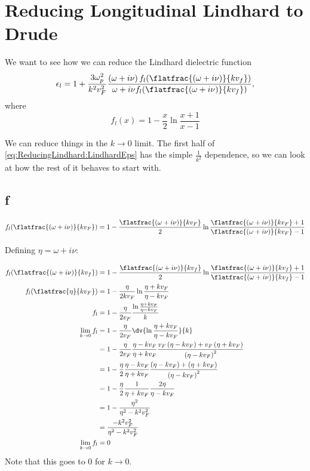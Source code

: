 \documentclass[../../main.tex]{subfiles}
\newcommand{\vf}{v_F}
\begin{document}
\section{Reducing Longitudinal Lindhard to Drude}
We want to see how we can reduce the Lindhard dielectric function
\begin{equation} \label{eq:ReducingLindhard:LindhardEps} 
 \epsilon_l = 1 + \frac{3 \omega_p^2}{k^2 v_F^2} \frac{\left(\omega + i \nu \right) f_l(\flatfrac{(\omega + i \nu)}{k v_f})}{\omega + i \nu f_l(\flatfrac{(\omega + i \nu)}{k v_f})},
\end{equation}
where 
\begin{equation}
	f_l(x) = 1 - \frac{x}{2} \ln\frac{x + 1}{x - 1}
\end{equation}

We can reduce things in the $k \rightarrow 0$ limit. The first half of \eqref{eq:ReducingLindhard:LindhardEps} has the simple $\frac{1}{k^2}$ dependence, so we can look at how the rest of it behaves to start with. 

\subsection{f}

\begin{align}
		f_l(\flatfrac{(\omega + i \nu)}{k v_F}) = 1 - \frac{\flatfrac{(\omega + i \nu)}{k v_F}}{2} \ln\frac{\flatfrac{(\omega + i \nu)}{k v_F} + 1}{\flatfrac{(\omega + i \nu)}{k v_F} - 1}
\end{align}

Defining $\eta = \omega + i \nu$:

\begin{align}
	f_l(\flatfrac{(\omega + i \nu)}{k v_f}) &= 1 - \frac{\flatfrac{(\omega + i \nu)}{k v_f}}{2} \ln\frac{\flatfrac{(\omega + i \nu)}{k v_f} + 1}{\flatfrac{(\omega + i \nu)}{k v_f} - 1} \\
	f_l(\flatfrac{\eta}{k \vf}) &= 1 - \frac{\eta}{2 k \vf} \ln\frac{\eta + k \vf}{\eta - k\vf} \\
	f_l &=  1 - \frac{\eta}{2 \vf} \frac{\ln\frac{\eta + k \vf}{\eta - k\vf}}{k} \\ 
	\lim_{k \to 0} f_l &= 1 - \frac{\eta}{2 \vf} \dv{\ln\frac{\eta + k \vf}{\eta - k\vf}}{k} \\
	&= 1 - \frac{\eta}{2 \vf} \frac{\eta - k \vf}{\eta + k\vf} \frac{\vf \left(\eta - k\vf \right)+ \vf \left(\eta + k \vf \right)}{\left( \eta - k \vf \right)^2} \\
	&= 1 - \frac{\eta}{2 } \frac{\eta - k \vf}{\eta + k\vf} \frac{\left(\eta - k\vf \right)+  \left(\eta + k \vf \right)}{\left( \eta - k \vf \right)^2} \\
	&= 1 - \frac{\eta}{2 } \frac{1}{\eta + k\vf} \frac{2 \eta}{\eta - k \vf } \\
	&= 1 - \frac{\eta^2}{\eta^2 - k^2 \vf^2} \\
	&= \frac{-k^2 \vf^2}{\eta^2 - k^2 \vf^2} \\
	\lim_{k \to 0} f_l &= 0
\end{align}
Note that this goes to $0$ for $k \to 0$.
\end{document}

